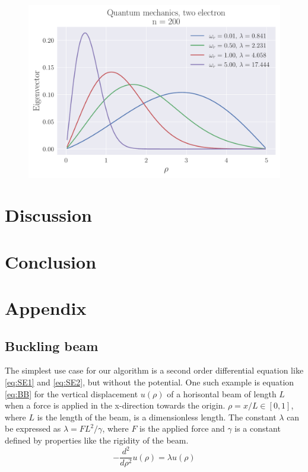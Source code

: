\documentclass[reprint,english,notitlepage,nofootinbib]{revtex4-1}  %
\begin{document}
\begin{figure}[h]
	\centering
	\includegraphics[width=\linewidth]{../output/QM2_200.pdf}
	\label{fig:QM2002}
	\caption{}
\end{figure}

\begin{table}
	
	\label{}
	\caption{}
\end{table}

\section{Discussion}

\section{Conclusion}

\section{Appendix}
\label{appendix}

\subsection{Buckling beam}

The simplest use case for our algorithm is a second order differential equation like \ref{eq:SE1} and \ref{eq:SE2}, but without the potential. One such example is equation \ref{eq:BB} for the vertical displacement $u(\rho)$ of a horisontal beam of length $L$ when a force is applied in the x-direction towards the origin. $\rho = x/L \in [0, 1]$, where $L$ is the length of the beam, is a dimensionless length. The constant $\lambda$ can be expressed as $\lambda = F L^2 / \gamma$, where $F$ is the applied force and $\gamma$ is a constant defined by properties like the rigidity of the beam.
\begin{equation}
	-\frac{d^2}{d\rho^2}u(\rho) = \lambda u(\rho)
	\label{eq:BB}
\end{equation}
\end{document}
